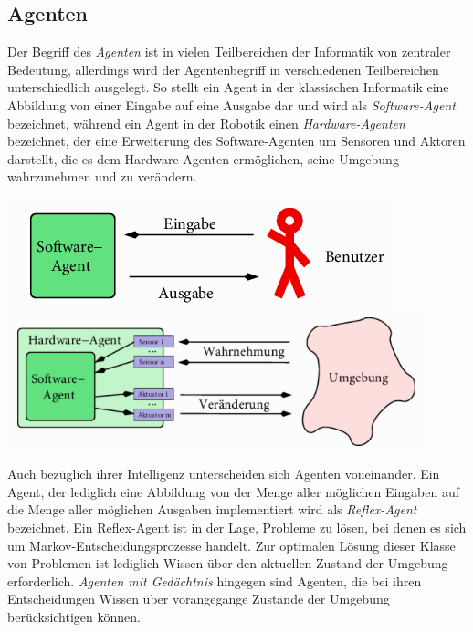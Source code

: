 \documentclass[a4paper]{scrartcl}
\newenvironment{Figure}
  {\par\medskip\noindent\minipage{\linewidth}}
  {\endminipage\par\medskip}
\begin{document}
\begin{multicols}{2}
            \subsection{Agenten}
                Der Begriff des \emph{Agenten} ist in vielen Teilbereichen der Informatik von zentraler Bedeutung, allerdings wird der Agentenbegriff in verschiedenen Teilbereichen unterschiedlich ausgelegt. So stellt ein Agent in der klassischen Informatik eine Abbildung von einer Eingabe auf eine Ausgabe dar und wird als \emph{Software-Agent} bezeichnet, während ein Agent in der Robotik einen \emph{Hardware-Agenten} bezeichnet, der eine Erweiterung des Software-Agenten um Sensoren und Aktoren darstellt, die es dem Hardware-Agenten ermöglichen, seine Umgebung wahrzunehmen und zu verändern. \cite{ertel2016}
                \begin{Figure}
                    \centering
                    \includegraphics[width=\linewidth]{softwareagent.png}
                    \includegraphics[width=\linewidth]{hardwareagent.png}
                \end{Figure}
                Auch bezüglich ihrer Intelligenz unterscheiden sich Agenten voneinander.
                Ein Agent, der lediglich eine Abbildung von der Menge aller möglichen Eingaben auf die Menge aller möglichen Ausgaben implementiert wird als \emph{Reflex-Agent} bezeichnet. Ein Reflex-Agent ist in der Lage, Probleme zu lösen, bei denen es sich um Markov-Entscheidungsprozesse handelt. Zur optimalen Lösung dieser Klasse von Problemen ist lediglich Wissen über den aktuellen Zustand der Umgebung erforderlich.
                \newline
                \emph{Agenten mit Gedächtnis} hingegen sind Agenten, die bei ihren Entscheidungen Wissen über vorangegange Zustände der Umgebung berücksichtigen können.
            

\end{multicols}
\end{document}
